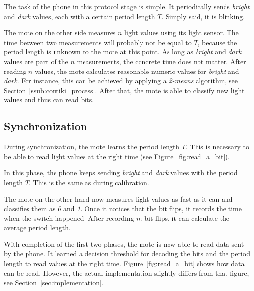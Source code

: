 \documentclass{sig-alternate} %
\begin{document}
The task of the phone in this protocol stage is simple.
It periodically sends \textit{bright} and \textit{dark} values, each with a certain period length $T$.
Simply said, it is blinking.

The mote on the other side measures $n$ light values using its light sensor.
The time between two measurements will probably not be equal to $T$, because the period length is unknown to the mote at this point.
As long as \textit{bright} and \textit{dark} values are part of the $n$ measurements, the concrete time does not matter.
After reading $n$ values, the mote calculates reasonable numeric values for \textit{bright} and \textit{dark}.
For instance, this can be achieved by applying a \mbox{\textit{2-means}} algorithm, see Section~\ref{ssub:contiki_process}.
After that, the mote is able to classify new light values and thus can read bits.

\subsection{Synchronization}
\label{sub:synchronization}

During synchronization, the mote learns the period length $T$.
This is necessary to be able to read light values at the right time (see Figure~\ref{fig:read_a_bit}).

In this phase, the phone keeps sending \textit{bright} and \textit{dark} values with the period length $T$.
This is the same as during calibration.

The mote on the other hand now measures light values as fast as it can and classifies them as \textit{0} and \textit{1}.
Once it notices that the bit flips, it records the time when the switch happened.
After recording $m$ bit flips, it can calculate the average period length.

With completion of the first two phases, the mote is now able to read data sent by the phone.
It learned a decision threshold for decoding the bits and the period length to read values at the right time.
Figure~\ref{fig:read_a_bit} shows how data can be read.
However, the actual implementation slightly differs from that figure, see Section~\ref{sec:implementation}.
\end{document}
